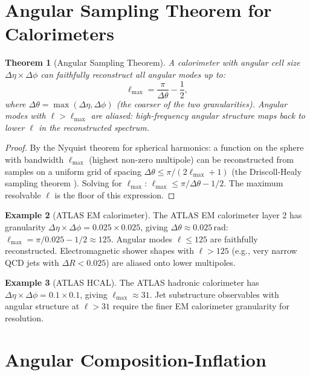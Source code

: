 \documentclass[twocolumn,10pt,a4paper]{article}
\theoremstyle{thmstyle}
\newtheorem{theorem}{Theorem}[section]
\theoremstyle{definition}
\newtheorem{example}[theorem]{Example}
\theoremstyle{remark}
\begin{document}
\section{Angular Sampling Theorem for Calorimeters}
\label{sec:sampling}

\begin{theorem}[Angular Sampling Theorem]
\label{thm:sampling}
A calorimeter with angular cell size $\Delta\eta \times \Delta\phi$
can faithfully reconstruct all angular modes up to:
\begin{equation}
\ell_{\max} = \frac{\pi}{\Delta\theta} - \frac{1}{2},
\label{eq:ell_max}
\end{equation}
where $\Delta\theta = \max(\Delta\eta, \Delta\phi)$ (the coarser of the
two granularities). Angular modes with $\ell > \ell_{\max}$ are aliased:
high-frequency angular structure maps back to lower $\ell$ in the
reconstructed spectrum.
\end{theorem}

\begin{proof}
By the Nyquist theorem for spherical harmonics: a function on the sphere
with bandwidth $\ell_{\max}$ (highest non-zero multipole) can be
reconstructed from samples on a uniform grid of spacing $\Delta\theta
\leq \pi/(2\ell_{\max}+1)$ (the Driscoll-Healy sampling theorem
\citep{driscoll1994}). Solving for $\ell_{\max}$:
$\ell_{\max} \leq \pi/\Delta\theta - 1/2$.
The maximum resolvable $\ell$ is the floor of this expression.
\end{proof}

\begin{example}[ATLAS EM calorimeter]
The ATLAS EM calorimeter layer 2 has granularity
$\Delta\eta \times \Delta\phi = 0.025 \times 0.025$, giving
$\Delta\theta \approx 0.025\,\mathrm{rad}$:
$\ell_{\max} = \pi/0.025 - 1/2 \approx 125$.
Angular modes $\ell \leq 125$ are faithfully reconstructed.
Electromagnetic shower shapes with $\ell > 125$ (e.g., very narrow
QCD jets with $\Delta R < 0.025$) are aliased onto lower multipoles.
\end{example}

\begin{example}[ATLAS HCAL]
The ATLAS hadronic calorimeter has $\Delta\eta \times \Delta\phi
= 0.1 \times 0.1$, giving $\ell_{\max} \approx 31$.
Jet substructure observables with angular structure at $\ell > 31$
require the finer EM calorimeter granularity for resolution.
\end{example}

\section{Angular Composition-Inflation}
\label{sec:angular_inflation}
\end{document}
